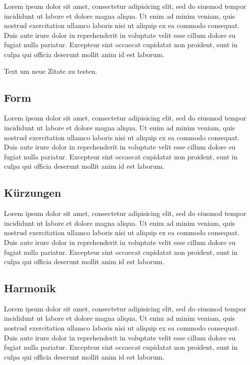 Lorem ipsum dolor sit amet, consectetur adipisicing elit, sed do eiusmod tempor incididunt ut labore et dolore magna aliqua. Ut enim ad minim veniam, quis nostrud exercitation ullamco laboris nisi ut aliquip ex ea commodo consequat. Duis aute irure dolor in reprehenderit in voluptate velit esse cillum dolore eu fugiat nulla pariatur. Excepteur sint occaecat cupidatat non proident, sunt in culpa qui officia deserunt mollit anim id est laborum.

Text um neue\autocite{roeder:bruckner} Zitate\autocite{heinze:bruckner} zu testen.


\subsection{Form}

Lorem ipsum dolor sit amet, consectetur adipisicing elit, sed do eiusmod tempor incididunt ut labore et dolore magna aliqua. Ut enim ad minim veniam, quis nostrud exercitation ullamco laboris nisi ut aliquip ex ea commodo consequat. Duis aute irure dolor in reprehenderit in voluptate velit esse cillum dolore eu fugiat nulla pariatur. Excepteur sint occaecat cupidatat non proident, sunt in culpa qui officia deserunt mollit anim id est laborum.


\subsection{Kürzungen}

Lorem ipsum dolor sit amet, consectetur adipisicing elit, sed do eiusmod tempor incididunt ut labore et dolore magna aliqua. Ut enim ad minim veniam, quis nostrud exercitation ullamco laboris nisi ut aliquip ex ea commodo consequat. Duis aute irure dolor in reprehenderit in voluptate velit esse cillum dolore eu fugiat nulla pariatur. Excepteur sint occaecat cupidatat non proident, sunt in culpa qui officia deserunt mollit anim id est laborum.


\subsection{Harmonik}

Lorem ipsum dolor sit amet, consectetur adipisicing elit, sed do eiusmod tempor incididunt ut labore et dolore magna aliqua. Ut enim ad minim veniam, quis nostrud exercitation ullamco laboris nisi ut aliquip ex ea commodo consequat. Duis aute irure dolor in reprehenderit in voluptate velit esse cillum dolore eu fugiat nulla pariatur. Excepteur sint occaecat cupidatat non proident, sunt in culpa qui officia deserunt mollit anim id est laborum.


